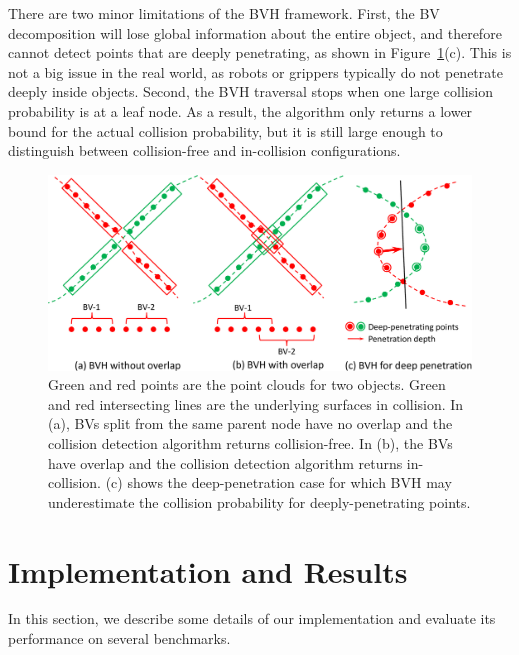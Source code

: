 There are two minor limitations of the BVH framework. First, the BV decomposition will lose global information about the entire object, and therefore cannot detect points that are deeply penetrating, as shown in Figure~\ref{fig:7:bvh_overlap}(c). This is not a big issue in the real world, as robots or grippers typically do not penetrate deeply inside objects. Second, the BVH traversal stops when one large collision probability is at a leaf node.
As a result, the algorithm only returns a lower bound for the actual collision probability, but it is still large enough to distinguish between collision-free and in-collision configurations.

\begin{figure}[!htb]
  \centering
  \includegraphics[width=0.9\linewidth]{figs/7/bvh_overlap.pdf}
  \caption[BVH acceleration for point-cloud collision]{\label{fig:7:bvh_overlap} Green and red points are the point clouds for two objects. Green and red intersecting lines are the underlying surfaces in collision. In (a), BVs split from the same parent node
  have no overlap and the collision detection algorithm returns collision-free. In (b), the BVs have overlap and the collision detection algorithm returns in-collision. (c) shows the deep-penetration case for which BVH may underestimate the collision probability for deeply-penetrating points.}
\end{figure}


\section{Implementation and Results}
\label{sec:7:results}
In this section, we describe some details of our implementation and evaluate its performance on several benchmarks.


